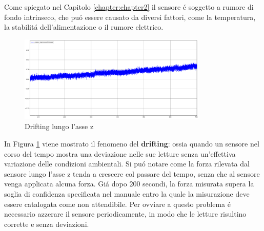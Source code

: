 Come spiegato nel Capitolo \ref{chapter:chapter2} il sensore \'{e} soggetto a rumore di fondo intrinseco, che 
pu\'{o} essere causato da diversi fattori, come la temperatura, la stabilit\'{a} dell'alimentazione o il rumore elettrico. 
\begin{figure}[H]
    \centering
    \includegraphics*[width=0.80\textwidth]{images/drifting.png}
    \caption{Drifting lungo l'asse z}
    \label{fig:drifting}
\end{figure}
In Figura \ref{fig:drifting} viene mostrato il fenomeno del \textbf{drifting}: ossia quando un sensore nel corso del tempo 
mostra una deviazione nelle sue letture senza un'effettiva variazione delle condizioni ambientali. 
Si pu\'{o} notare come la forza rilevata dal sensore lungo l'asse z tenda a crescere col passare del tempo, senza che al sensore 
venga applicata alcuna forza. Gi\'{a} dopo 200 secondi, la forza misurata supera la soglia di confidenza specificata nel manuale 
entro la quale la misurazione deve essere catalogata come non attendibile.
Per ovviare a questo problema \'{e} necessario azzerare il sensore periodicamente, in modo che le letture risultino corrette 
e senza deviazioni.
